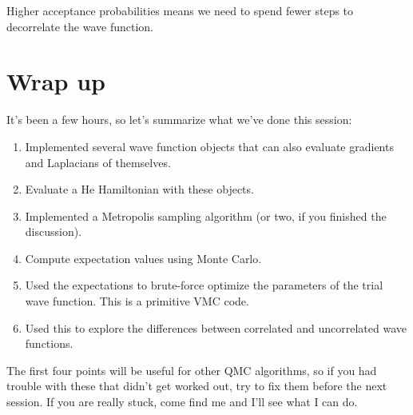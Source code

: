 \documentclass[12pt]{article}
\begin{document}
Higher acceptance probabilities means we need to spend fewer steps to decorrelate the wave function.

\section{Wrap up}

It's been a few hours, so let's summarize what we've done this session:
\begin{enumerate}
  \item
    Implemented several wave function objects that can also evaluate gradients and Laplacians of themselves.
  \item
    Evaluate a He Hamiltonian with these objects.
  \item
    Implemented a Metropolis sampling algorithm (or two, if you finished the discussion).
  \item
    Compute expectation values using Monte Carlo.
  \item
    Used the expectations to brute-force optimize the parameters of the trial wave function. 
    This is a primitive VMC code.
  \item
    Used this to explore the differences between correlated and uncorrelated wave functions.
\end{enumerate}
The first four points will be useful for other QMC algorithms, so if you had trouble with these that didn't get worked out, try to fix them before the next session.
If you are really stuck, come find me and I'll see what I can do.
\end{document}
